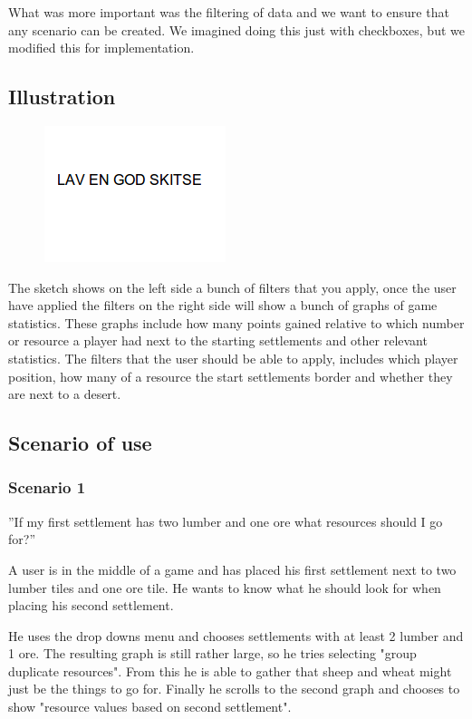 \documentclass[journal]{vgtc}                %
\begin{document}
What was more important was the filtering of data and we want to ensure that
any scenario can be created. We imagined doing this just with checkboxes, but
we modified this for implementation. 

\subsection{Illustration}
\begin{figure}[!h]
  \centering
  \includegraphics[scale=0.4]{pic2.png}
\end{figure}
\newpage
\noindent

The sketch shows on the left side a bunch of filters that you apply, once the
user have applied the filters on the right side will show a bunch of graphs
of game statistics. These graphs include how many points gained relative to
which number or resource a player had next to the starting settlements and
other relevant statistics. The filters that the user should be able to apply,
includes which player position, how many of a resource the start settlements
border and whether they are next to a desert.

\subsection{Scenario of use}

\subsubsection{Scenario 1}

”If my first settlement has two lumber and one ore what resources should I go
for?”

A user is in the middle of a game and has placed his first settlement next to
two lumber tiles and one ore tile. He wants to know what he should look for
when placing his second settlement.

He uses the drop downs menu and chooses settlements with at least 2 lumber and
1 ore. The resulting graph is still rather large, so he tries selecting "group
duplicate resources". From this he is able to gather that sheep and wheat
might just be the things to go for. Finally he scrolls to the second graph and
chooses to show "resource values based on second settlement". 
\end{document}
